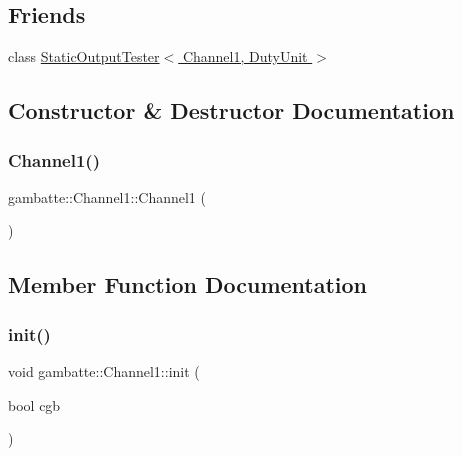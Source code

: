\subsection*{Friends}
\begin{DoxyCompactItemize}
\item 
class \hyperlink{classgambatte_1_1Channel1_a9aa5c336a7894877fa17f461eb66ddb1}{Static\+Output\+Tester$<$ Channel1, Duty\+Unit $>$}
\end{DoxyCompactItemize}


\subsection{Constructor \& Destructor Documentation}
\mbox{\label{classgambatte_1_1Channel1_af9772f188a3ea499d5ba9d39dbea0545}} 
\subsubsection{\texorpdfstring{Channel1()}{Channel1()}}
{\footnotesize\ttfamily gambatte\+::\+Channel1\+::\+Channel1 (\begin{DoxyParamCaption}{ }\end{DoxyParamCaption})}



\subsection{Member Function Documentation}
\mbox{\label{classgambatte_1_1Channel1_a91245cfe66613f5243b55cee311564cf}} 
\subsubsection{\texorpdfstring{init()}{init()}}
{\footnotesize\ttfamily void gambatte\+::\+Channel1\+::init (\begin{DoxyParamCaption}\item[{bool}]{cgb }\end{DoxyParamCaption})}

\mbox{\label{classgambatte_1_1Channel1_aa40be7480b84da826cc6ec4eec9a4cf8}} 

